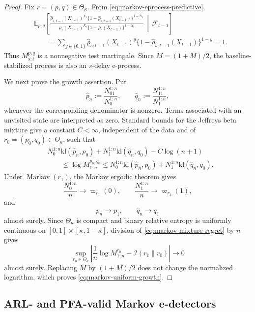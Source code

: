 \documentclass[12pt]{article}
\DeclareMathOperator{\Markov}{Markov}
\theoremstyle{spaced}
\theoremstyle{remark}
\newcommand{\kl}{\mathrm{kl}}
\begin{document}
\begin{proof}
Fix \(r=(p,q)\in\Theta_\kappa\).  From
\eqref{eq:markov-eprocess-predictive},
\[
\begin{aligned}
&\mathbb E_{p,q}
\left[
    \frac{
        \widehat\rho_{s,t-1}(X_{t-1})^{X_t}
        \{1-\widehat\rho_{s,t-1}(X_{t-1})\}^{1-X_t}
    }{
        \rho_r(X_{t-1})^{X_t}
        \{1-\rho_r(X_{t-1})\}^{1-X_t}
    }
    \,\middle|\,
    \mathcal F_{t-1}
\right]
\\
&\qquad=
\sum_{y\in\{0,1\}}
\widehat\rho_{s,t-1}(X_{t-1})^y
\{1-\widehat\rho_{s,t-1}(X_{t-1})\}^{1-y}
=1.
\end{aligned}
\]
Thus \(M_{s:t}^{p,q}\) is a nonnegative test martingale.  Since
\(\widetilde M=(1+M)/2\), the baseline-stabilized process is also an
\(s\)-delay e-process.

We next prove the growth assertion.  Put
\[
    \widehat p_n
    :=
    \frac{N_{01}^{1:n}}{N_0^{1:n}},
    \qquad
    \widehat q_n
    :=
    \frac{N_{11}^{1:n}}{N_1^{1:n}},
\]
whenever the corresponding denominator is nonzero.  Terms associated
with an unvisited state are interpreted as zero.  Standard bounds for
the Jeffreys beta mixture give a constant \(C<\infty\), independent
of the data and of \(r_0=(p_0,q_0)\in\Theta_\kappa\), such that
\begin{align}
&N_0^{1:n}\kl(\widehat p_n,p_0)
+
N_1^{1:n}\kl(\widehat q_n,q_0)
-C\log(n+1)
\nonumber\\
&\qquad\le
\log M_{1:n}^{p_0,q_0}
\le
N_0^{1:n}\kl(\widehat p_n,p_0)
+
N_1^{1:n}\kl(\widehat q_n,q_0).
\label{eq:markov-mixture-regret}
\end{align}
Under \(\Markov(r_1)\), the Markov ergodic theorem gives
\[
    \frac{N_0^{1:n}}n\to\varpi_{r_1}(0),
    \qquad
    \frac{N_1^{1:n}}n\to\varpi_{r_1}(1),
\]
and
\[
    \widehat p_n\to p_1,
    \qquad
    \widehat q_n\to q_1
\]
almost surely.  Since \(\Theta_\kappa\) is compact and binary relative
entropy is uniformly continuous on
\([0,1]\times[\kappa,1-\kappa]\), division of
\eqref{eq:markov-mixture-regret} by \(n\) gives
\[
    \sup_{r_0\in\Theta_\kappa}
    \left|
        \frac1n\log M_{1:n}^{r_0}
        -
        \mathcal I(r_1\|r_0)
    \right|
    \longrightarrow0
\]
almost surely.  Replacing \(M\) by \((1+M)/2\) does not change the
normalized logarithm, which proves
\eqref{eq:markov-uniform-growth}.
\end{proof}

\subsection{ARL- and PFA-valid Markov e-detectors}
\end{document}
